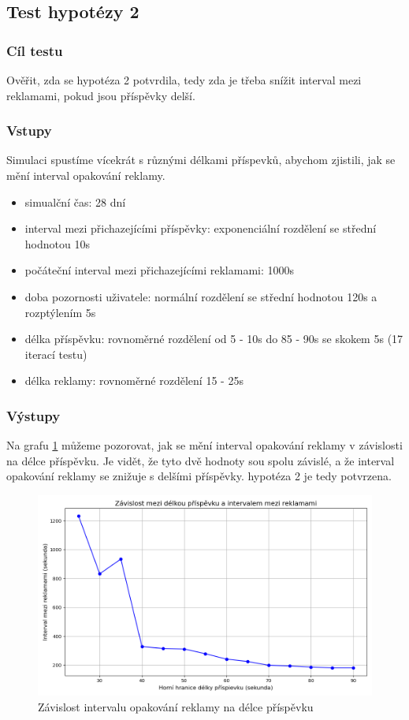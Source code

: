 \documentclass[11pt, a4paper]{article}
\begin{document}
\newpage

\subsection{Test hypotézy 2}

\subsubsection{Cíl testu}
Ověřit, zda se hypotéza 2 potvrdila, tedy zda je třeba snížit interval mezi reklamami, pokud jsou příspěvky delší.
\subsubsection{Vstupy}
Simulaci spustíme vícekrát s různými délkami příspevků, abychom zjistili, jak se mění interval opakování reklamy.
\begin{itemize}
    \item simualční čas: 28 dní
    \item interval mezi přichazejícími příspěvky: exponenciální rozdělení se střední hodnotou 10s
    \item počáteční interval mezi přichazejícími reklamami: 1000s
    \item doba pozornosti uživatele: normální rozdělení se střední hodnotou 120s a rozptýlením 5s
    \item délka příspěvku: rovnoměrné rozdělení od 5 - 10s do 85 - 90s se skokem 5s (17 iterací testu)
    \item délka reklamy: rovnoměrné rozdělení 15 - 25s
\end{itemize}

\subsubsection{Výstupy}

Na grafu \ref{fig:post_length_vs_ad_interval} můžeme pozorovat, jak se mění interval opakování reklamy v závislosti na délce příspěvku.
Je vidět, že tyto dvě hodnoty sou spolu závislé, a že interval opakování reklamy se znižuje s delšími příspěvky.
hypotéza 2 je tedy potvrzena.
\begin{figure}[h]
    \centering
    \includegraphics[width=\linewidth]{post_length_vs_ad_interval.png}
    \caption{Závislost intervalu opakování reklamy na délce příspěvku}
    \label{fig:post_length_vs_ad_interval}
\end{figure}
\end{document}
